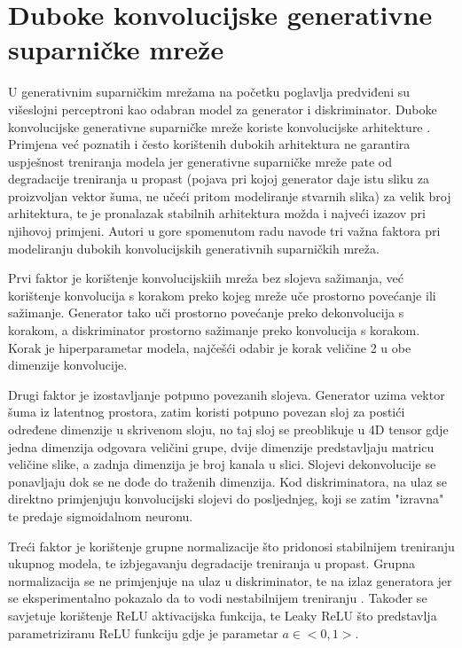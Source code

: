 \documentclass[times, utf8, diplomski]{fer}
\begin{document}
\pagebreak

\section{Duboke konvolucijske generativne suparničke mreže}
U generativnim suparničkim mrežama na početku poglavlja predviđeni su višeslojni perceptroni kao odabran model za generator i diskriminator. Duboke konvolucijske generativne suparničke mreže koriste konvolucijske arhitekture \cite{radford}. Primjena već poznatih i često korištenih dubokih arhitektura ne garantira uspješnost treniranja modela jer generativne suparničke mreže pate od degradacije treniranja u propast (pojava pri kojoj generator daje istu sliku za proizvoljan vektor šuma, ne učeći pritom modeliranje stvarnih slika) za velik broj arhitektura, te je pronalazak stabilnih arhitektura možda i najveći izazov pri njihovoj primjeni. Autori u gore spomenutom radu navode tri važna faktora pri modeliranju dubokih konvolucijskih generativnih suparničkih mreža. \par

Prvi faktor je korištenje konvolucijskiih mreža bez slojeva sažimanja, već korištenje konvolucija s korakom preko kojeg mreže uče prostorno povećanje ili sažimanje. Generator tako uči prostorno povećanje preko dekonvolucija s korakom, a diskriminator prostorno sažimanje preko konvolucija s korakom. Korak je hiperparametar modela, najčešći odabir je korak veličine 2 u obe dimenzije konvolucije.\par

Drugi faktor je izostavljanje potpuno povezanih slojeva. Generator uzima vektor šuma iz latentnog prostora, zatim koristi potpuno povezan sloj za postići određene dimenzije u skrivenom sloju, no taj sloj se preoblikuje u 4D tensor gdje jedna dimenzija odgovara veličini grupe, dvije dimenzije predstavljaju matricu veličine slike, a zadnja dimenzija je broj kanala u slici. Slojevi dekonvolucije se ponavljaju dok se ne dođe do traženih dimenzija. Kod diskriminatora, na ulaz se direktno primjenjuju konvolucijski slojevi do posljednjeg, koji se zatim "izravna" te predaje sigmoidalnom neuronu. \par

Treći faktor je korištenje grupne normalizacije što pridonosi stabilnijem treniranju ukupnog modela, te izbjegavanju degradacije treniranja u propast.
Grupna normalizacija se ne primjenjuje na ulaz u diskriminator, te na izlaz generatora jer se eksperimentalno pokazalo da to vodi nestabilnijem treniranju \cite{radford}. Također se savjetuje korištenje ReLU aktivacijska funkcija, te Leaky ReLU što predstavlja parametriziranu ReLU funkciju gdje je parametar $a \in <0,1>$. \par
\end{document}
